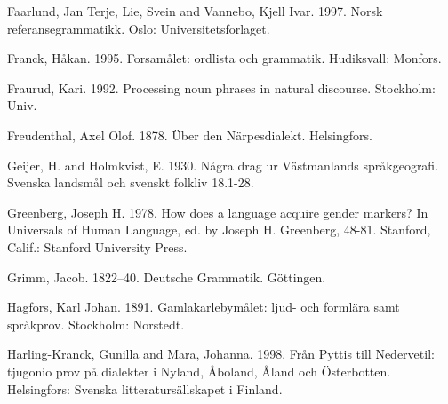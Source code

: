 \begin{styleBodytextC}
Faarlund, Jan Terje, Lie, Svein and Vannebo, Kjell Ivar. 1997. Norsk referansegrammatikk. Oslo: Universitetsforlaget.

\end{styleBodytextC}

\begin{styleBodytextC}
Franck, Håkan. 1995. Forsamålet: ordlista och grammatik. Hudiksvall: Monfors.

\end{styleBodytextC}

\begin{styleBodytextC}
Fraurud, Kari. 1992. Processing noun phrases in natural discourse. Stockholm: Univ.

\end{styleBodytextC}

\begin{styleBodytextC}
Freudenthal, Axel Olof. 1878. Über den Närpesdialekt. Helsingfors.

\end{styleBodytextC}

\begin{styleBodytextC}
Geijer, H. and Holmkvist, E. 1930. Några drag ur Västmanlands språkgeografi. Svenska landsmål och svenskt folkliv 18.1-28.

\end{styleBodytextC}

\begin{styleBodytextC}
Greenberg, Joseph H. 1978. How does a language acquire gender markers? In Universals of Human Language, ed. by Joseph H. Greenberg, 48-81. Stanford, Calif.: Stanford University Press.

\end{styleBodytextC}

\begin{styleBodytextC}
Grimm, Jacob. 1822–40. Deutsche Grammatik. Göttingen.

\end{styleBodytextC}

\begin{styleBodytextC}
Hagfors, Karl Johan. 1891. Gamlakarlebymålet: ljud- och formlära samt språkprov. Stockholm: Norstedt.

\end{styleBodytextC}

\begin{styleBodytextC}
Harling-Kranck, Gunilla and Mara, Johanna. 1998. Från Pyttis till Nedervetil: tjugonio prov på dialekter i Nyland, Åboland, Åland och Österbotten. Helsingfors: Svenska litteratursällskapet i Finland.

\end{styleBodytextC}


